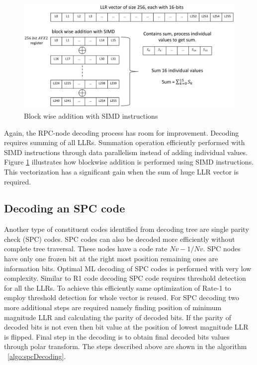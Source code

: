 \begin{figure}[]
	\centering
	\includegraphics[width=1.0\textwidth]{./figures/SIMD_Addition.pdf}
	\caption{Block wise addition with SIMD instructions}
	\label{fig:SIMDAddition}
\end{figure}

Again, the RPC-node decoding process has room for improvement. Decoding requires summing of all LLRs. Summation operation efficiently performed with SIMD instructions through data parallelism instead of adding individual values. Figure \ref{fig:SIMDAddition} illustrates how blockwise addition is performed using SIMD instructions. This vectorization has a significant gain when the sum of huge LLR vector is required.

\subsection{Decoding an SPC code}
Another type of constituent codes identified from decoding tree are single parity check (SPC) codes. SPC codes can also be decoded more efficiently without complete tree traversal. These nodes have a code rate $Nv-1/Nv$. SPC nodes have only one frozen bit at the right most position remaining ones are information bits. Optimal ML decoding of SPC codes is performed with very low complexity. Similar to R1 code decoding SPC code requires threshold detection for all the LLRs. To achieve this efficiently same optimization of Rate-1 to employ threshold detection for whole vector is reused. For SPC decoding two more additional steps are required namely finding position of minimum magnitude LLR and calculating the parity of decoded bits. If the parity of decoded bits is not even then bit value at the position of lowest magnitude LLR is flipped. Final step in the decoding is to obtain final decoded bits values through polar transform. The steps described above are shown in the algorithm ~\ref{algo:spcDecoding}.

